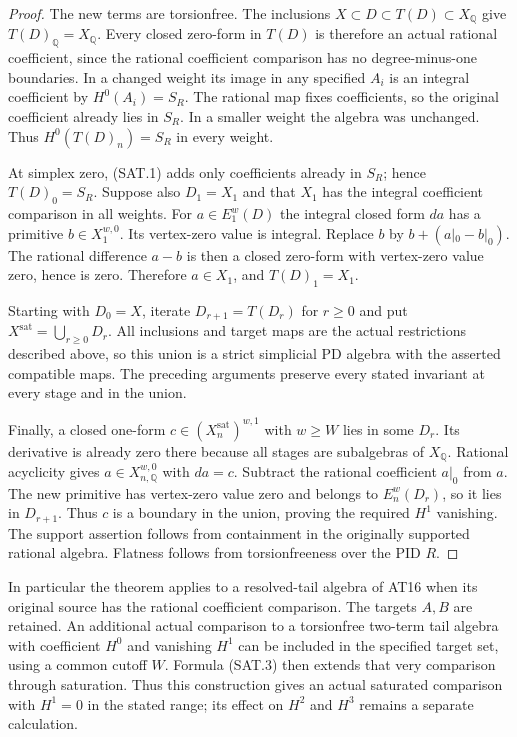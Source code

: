 \begin{proof}
The new terms are torsionfree. The inclusions
$X\subset D\subset T(D)\subset X_{\mathbb Q}$ give
$T(D)_{\mathbb Q}=X_{\mathbb Q}$.
Every closed zero-form in $T(D)$ is therefore an actual rational
coefficient, since the rational coefficient comparison has no
degree-minus-one boundaries. In a changed weight its image in
any specified $A_i$ is an integral coefficient by $H^0(A_i)=S_R$.
The rational map fixes coefficients, so the original coefficient
already lies in $S_R$. In a smaller weight the algebra was unchanged.
Thus $H^0(T(D)_n)=S_R$ in every weight.

At simplex zero, (SAT.1) adds only coefficients already in $S_R$;
hence $T(D)_0=S_R$. Suppose also $D_1=X_1$ and that $X_1$
has the integral coefficient comparison in all weights.
For $a\in E_1^w(D)$ the integral closed form $da$ has a primitive
$b\in X_1^{w,0}$. Its vertex-zero value is integral.
Replace $b$ by $b+(a|_0-b|_0)$.
The rational difference $a-b$ is then a closed zero-form
with vertex-zero value zero, hence is zero.
Therefore $a\in X_1$, and $T(D)_1=X_1$.

Starting with $D_0=X$, iterate $D_{r+1}=T(D_r)$ for
$r\geq0$ and put $X^{\mathrm{sat}}=\bigcup_{r\geq0}D_r$.
All inclusions and target maps are the actual restrictions
described above, so this union is a strict simplicial PD algebra
with the asserted compatible maps. The preceding arguments
preserve every stated invariant at every stage and in the union.

Finally, a closed one-form $c\in(X^{\mathrm{sat}}_n)^{w,1}$
with $w\geq W$ lies in some $D_r$. Its derivative is already
zero there because all stages are subalgebras of $X_{\mathbb Q}$.
Rational acyclicity gives $a\in X_{n,\mathbb Q}^{w,0}$ with $da=c$.
Subtract the rational coefficient $a|_0$ from $a$.
The new primitive has vertex-zero value zero and belongs
to $E_n^w(D_r)$, so it lies in $D_{r+1}$.
Thus $c$ is a boundary in the union, proving the required $H^1$
vanishing. The support assertion follows from containment in
the originally supported rational algebra. Flatness follows
from torsionfreeness over the PID $R$.
\end{proof}

In particular the theorem applies to a resolved-tail algebra
of AT16 when its original source has the rational coefficient
comparison. The targets $A,B$ are retained. An additional actual
comparison to a torsionfree two-term tail algebra with coefficient
$H^0$ and vanishing $H^1$ can be included in the specified target
set, using a common cutoff $W$. Formula (SAT.3) then extends that
very comparison through saturation. Thus this construction gives
an actual saturated comparison with $H^1=0$ in the stated range;
its effect on $H^2$ and $H^3$ remains a separate calculation.
